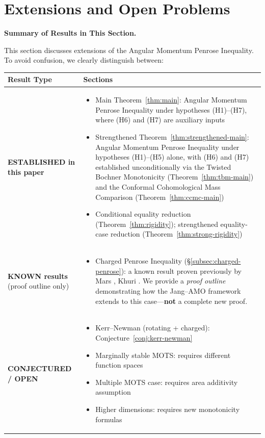 \section{Extensions and Open Problems}\label{sec:extensions}

\textbf{Summary of Results in This Section.}

This section discusses extensions of the Angular Momentum Penrose Inequality. To avoid confusion, we clearly distinguish between:

\begin{center}
\renewcommand{\arraystretch}{1.3}
\begin{tabular}{@{}p{5cm}p{8cm}@{}}
\toprule
\textbf{Result Type} & \textbf{Sections} \\
\midrule
\textbf{ESTABLISHED in this paper} &
\begin{itemize}[leftmargin=1em, nosep]
    \item Main Theorem~\ref{thm:main}: Angular Momentum Penrose Inequality under hypotheses (H1)--(H7), where (H6) and (H7) are auxiliary inputs
    \item Strengthened Theorem~\ref{thm:strengthened-main}: Angular Momentum Penrose Inequality under hypotheses (H1)--(H5) alone, with (H6) and (H7) established unconditionally via the Twisted Bochner Monotonicity (Theorem~\ref{thm:tbm-main}) and the Conformal Cohomological Mass Comparison (Theorem~\ref{thm:ccmc-main})
    \item Conditional equality reduction (Theorem~\ref{thm:rigidity}); strengthened equality-case reduction (Theorem~\ref{thm:strong-rigidity})
\end{itemize} \\
\addlinespace
\textbf{KNOWN results} (proof outline only) &
\begin{itemize}[leftmargin=1em, nosep]
    \item Charged Penrose Inequality (\S\ref{subsec:charged-penrose}): a known result proven previously by Mars \cite{mars2009}, Khuri \cite{khuri2015charged}. We provide a \textit{proof outline} demonstrating how the Jang--AMO framework extends to this case---\textbf{not} a complete new proof.
\end{itemize} \\
\addlinespace
\textbf{CONJECTURED / OPEN} &
\begin{itemize}[leftmargin=1em, nosep]
    \item Kerr--Newman (rotating + charged): Conjecture~\ref{conj:kerr-newman}
    \item Marginally stable MOTS: requires different function spaces
    \item Multiple MOTS case: requires area additivity assumption
    \item Higher dimensions: requires new monotonicity formulas
\end{itemize} \\
\bottomrule
\end{tabular}
\end{center}

